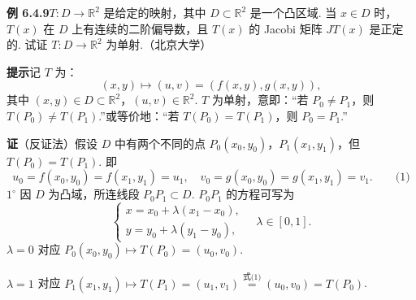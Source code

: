 \documentclass[UTF8,12pt,a4paper,fontset=fandol]{ctexart}
\begin{document}
\noindent\textbf{例 6.4.9}\quad $T:D\to\mathbb R^2$ 是给定的映射，其中 $D\subset\mathbb R^2$ 是一个凸区域. 当 $x\in D$ 时，$T(x)$ 在 $D$ 上有连续的二阶偏导数，且 $T(x)$ 的 Jacobi 矩阵 $JT(x)$ 是正定的. 试证 $T:D\to\mathbb R^2$ 为单射.（北京大学）

\noindent\textbf{提示}\quad 记 $T$ 为：
\[
  (x,y)\mapsto(u,v)=(f(x,y),g(x,y)),
\]
其中 $(x,y)\in D\subset\mathbb R^2$，$(u,v)\in\mathbb R^2$. $T$ 为单射，意即：“若 $P_0\ne P_1$，则 $T(P_0)\ne T(P_1)$.”或等价地：“若 $T(P_0)=T(P_1)$，则 $P_0=P_1$.”

\noindent\textbf{证}\quad （反证法）假设 $D$ 中有两个不同的点 $P_0(x_0,y_0)$，$P_1(x_1,y_1)$，但 $T(P_0)=T(P_1)$. 即
\[
  u_0=f(x_0,y_0)=f(x_1,y_1)=u_1,\quad
  v_0=g(x_0,y_0)=g(x_1,y_1)=v_1. \qquad\text{(1)}
\]
$1^\circ$ 因 $D$ 为凸域，所连线段 $P_0P_1\subset D$. $P_0P_1$ 的方程可写为
\[
\begin{cases}
  x=x_0+\lambda(x_1-x_0),\\
  y=y_0+\lambda(y_1-y_0),
\end{cases}\quad \lambda\in[0,1].
\]
$\lambda=0$ 对应 $P_0(x_0,y_0)\mapsto T(P_0)=(u_0,v_0)$.

$\lambda=1$ 对应 $P_1(x_1,y_1)\mapsto T(P_1)=(u_1,v_1)\overset{\text{式(1)}}{=}(u_0,v_0)=T(P_0)$.
\end{document}
